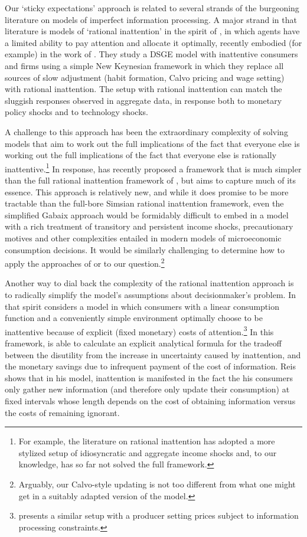 \documentclass[titlepage]{\econtex}\newcommand{\texname}{cAndCwithStickyE}
\begin{document}
Our `sticky expectations' approach is related to several strands of the burgeoning literature on models of imperfect information processing.  A major strand in that literature is models of `rational inattention' in the spirit of \cite{simsInattention}, in which agents have a limited ability to pay attention and allocate it optimally, recently embodied (for example) in the work of \cite{mackWiedREStud15}.  They study a DSGE model with inattentive consumers and firms using a simple New Keynesian framework in which they replace all sources of slow adjustment (habit formation, Calvo pricing and wage setting) with rational inattention.  The setup with rational inattention can match the sluggish responses observed in aggregate data, in response both to monetary policy shocks and to technology shocks.

A challenge to this approach has been the extraordinary complexity of solving models that aim to work out the full implications of the fact that everyone else is working out the full implications of the fact that everyone else is rationally inattentive.\footnote{For example, the literature on rational inattention has adopted a more stylized setup of idiosyncratic and aggregate income shocks and, to our knowledge, has so far not solved the full \cite{ksHetero} framework.}
In response, \cite{gabaixSparsityQJE} has recently proposed a framework that is much simpler than the full rational inattention framework of \cite{simsInattention}, but aims to capture much of its essence.  This approach is relatively new, and while it does promise to be more tractable than the full-bore Simsian rational inattention framework, even the simplified Gabaix approach would be formidably difficult to embed in a model with a rich treatment of transitory and persistent income shocks, precautionary motives and other complexities entailed in modern models of microeconomic consumption decisions. It would be similarly challenging to determine how to apply the approaches of \cite{woodfordImperfect} or \cite{msInertiaAER} to our question.\footnote{Arguably, our Calvo-style updating is not too different from what one might get in a suitably adapted version of the \cite{msInertiaAER} model.}

Another way to dial back the complexity of the rational inattention approach is to radically simplify the model's assumptions about decisionmaker's problem.  In that spirit \cite{reis:inattentive} considers a model in which consumers with a linear consumption function and a conveniently simple environment optimally choose to be inattentive because of explicit (fixed monetary) costs of attention.\footnote{\cite{reis:inpro} presents a similar setup with a producer setting prices subject to information processing constraints.}  In this framework, \cite{reis:inattentive} is able to calculate an explicit analytical formula for the tradeoff between the disutility from the increase in uncertainty caused by inattention, and the monetary savings due to infrequent payment of the cost of information.  Reis shows that in his model, inattention is manifested in the fact the his consumers only gather new information (and therefore only update their consumption) at fixed intervals whose length depends on the cost of obtaining information versus the costs of remaining ignorant.
\end{document}

